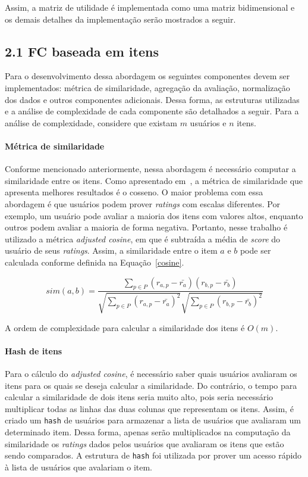 \documentclass[brazil,a4paper,11pt]{article}
\begin{document}
Assim, a matriz de utilidade é implementada como uma matriz bidimensional e os demais detalhes da implementação serão mostrados a seguir.


\subsection{2.1 FC baseada em itens}

Para o desenvolvimento dessa abordagem os seguintes componentes devem ser implementados: métrica de similaridade, agregação da avaliação, normalização dos dados e outros componentes adicionais. Dessa forma, as estruturas utilizadas e a análise de complexidade de cada componente são detalhados a seguir. Para a análise de complexidade, considere que existam $m$ usuários e $n$ itens.

\paragraph{Métrica de similaridade} Conforme mencionado anteriormente, nessa abordagem é necessário computar a similaridade entre os itens. Como apresentado em~\cite{Jannach2010}, a métrica de similaridade que apresenta melhores resultados é o cosseno. O maior problema com essa abordagem é que usuários podem prover \textit{ratings} com escalas diferentes. Por exemplo, um usuário pode avaliar a maioria dos itens com valores altos, enquanto outros podem avaliar a maioria de forma negativa. Portanto, nesse trabalho é utilizado a métrica \textit{adjusted cosine}, em que é subtraída a média de \textit{score} do usuário de seus \textit{ratings}. Assim, a similaridade entre o item $a$ e $b$ pode ser calculada conforme definida na Equação~\ref{cosine}.

\begin{equation}
\label{cosine}
 sim(a,b) = \frac{\sum_{p \in P}(r_{a,p} - \bar{r_a})(r_{b,p} - \bar{r_b})}           {\sqrt{\sum_{p \in P}(r_{a,p} - \bar{r_a})^2} \sqrt{\sum_{p \in P}(r_{b,p} - \bar{r_b})^2}}
\end{equation}

\noindent A ordem de complexidade para calcular a similaridade dos itens é $O(m)$. 

\paragraph{Hash de itens} Para o cálculo do \textit{adjusted cosine}, é necessário saber quais usuários avaliaram os itens para os quais se deseja calcular a similaridade. Do contrário, o tempo para calcular a similaridade de dois itens seria muito alto, pois seria necessário multiplicar todas as linhas das duas colunas que representam os itens. Assim, é criado um \texttt{hash} de usuários para armazenar a lista de usuários que avaliaram um determinado item. Dessa forma, apenas serão multiplicados na computação da similaridade os \textit{ratings} dados pelos usuários que avaliaram os itens que estão sendo comparados. A estrutura de \texttt{hash} foi utilizada por prover um acesso rápido à lista de usuários que avalariam o item. 
\end{document}
